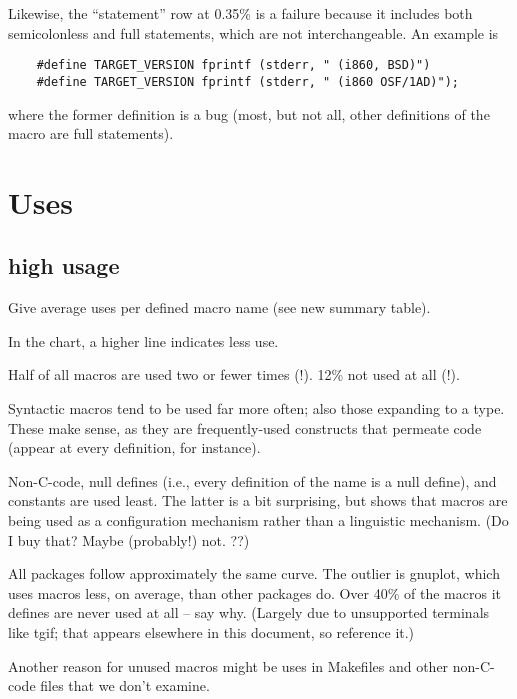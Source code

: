 \documentclass[10pt]{article}
\newcommand{\pkg}[1]{\textsf{#1}}
\begin{document}
Likewise, the ``statement'' row at 0.35\% is a failure because it includes
both semicolonless and full statements, which are not interchangeable.  An
example is
\begin{verbatim}
    #define TARGET_VERSION fprintf (stderr, " (i860, BSD)")
    #define TARGET_VERSION fprintf (stderr, " (i860 OSF/1AD)");
\end{verbatim}
where the former definition is a bug (most, but not all, other definitions
of the macro are full statements).




\section{Uses}

\subsection{high usage}

        Give average uses per defined macro name (see new summary table).

        In the chart, a higher line indicates less use.

        Half of all macros are used two or fewer times (!).  12\% not used
          at all (!).

        Syntactic macros tend to be used far more often; also those
          expanding to a type.  These make sense, as they are
          frequently-used constructs 
          that permeate code (appear at every definition, for instance).

        Non-C-code, null defines (i.e., every definition of the name is a
          null define), and constants are used least.  The latter is a bit
          surprising, but shows that macros are being used as a
          configuration mechanism rather than a linguistic mechanism.  (Do
          I buy that?  Maybe (probably!) not. ??)

        All packages follow approximately the same curve.  The outlier is
          \pkg{gnuplot}, which uses macros less, on average, than other packages
          do.  Over 40\% of the macros it defines are never used at all --
          say why.  (Largely due to unsupported terminals like tgif; that
          appears elsewhere in this document, so reference it.)

          Another reason for unused macros might be uses in Makefiles and
          other non-C-code files that we don't examine.
\end{document}
